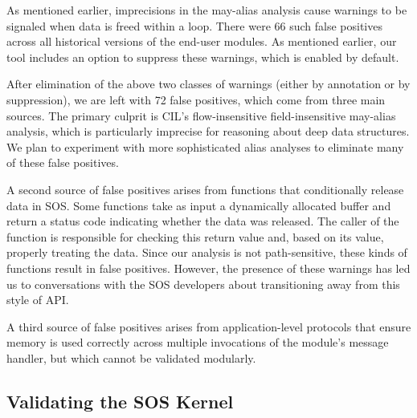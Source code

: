\smallskip
{}
As mentioned earlier, imprecisions in the may-alias analysis cause
warnings to be signaled when data is freed within a loop.
There were 66 such false positives across all historical versions of
the end-user modules.  As mentioned earlier, our tool includes an
option to suppress these warnings, which is enabled by default.  

\smallskip
{}
After elimination of the above two classes of warnings (either
by annotation or by suppression), we are left with 72 false
positives, which come from three main sources.
The primary culprit is CIL's flow-insensitive field-insensitive
may-alias analysis, which is particularly imprecise
for reasoning about deep data structures.  
We plan to experiment with more sophisticated alias analyses to
eliminate many of these false positives.

A second source of false positives arises from functions that
conditionally release data in SOS.  Some functions take as input a dynamically
allocated buffer and return a status code indicating whether the data was released.
The caller of the function is responsible for checking this return value and,
based on its value, properly treating the data.
Since our analysis is not path-sensitive, these kinds of functions
result in false positives.
However, the presence of these warnings has led us to conversations with the SOS 
developers about transitioning away from this style of API.

A third source of false positives arises from application-level protocols that
ensure memory is used correctly across multiple invocations of the
module's message handler, but which cannot be validated modularly.



\subsection{Validating the SOS Kernel}

